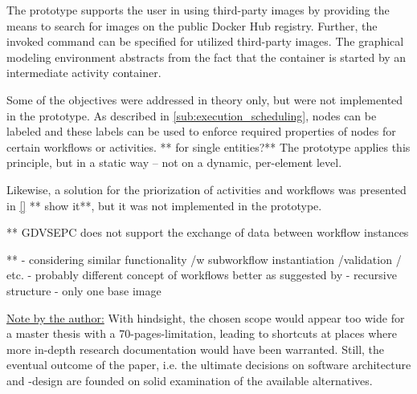   The prototype supports the user in using third-party images by providing the means to search for images on the public Docker Hub registry. Further, the invoked command can be specified for utilized third-party images. The graphical modeling environment abstracts from the fact that the container is started by an intermediate activity container.


  Some of the objectives were addressed in theory only, but were not implemented in the prototype.
  As described in \ref{sub:execution_scheduling}, nodes can be labeled and these labels can be used to enforce required properties of nodes for certain workflows or activities. ** for single entities?**
  The prototype applies this principle, but in a static way -- not on a dynamic, per-element level.

  Likewise, a solution for the priorization of activities and workflows was presented in \ref{} ** show it**, but it was not implemented in the prototype.


  ** GDVSEPC does not support the exchange of data between workflow instances

  **
  - considering similar functionality /w subworkflow instantiation /validation / etc.    - probably different concept of workflows better as suggested by \cite[119]{Schulze1998Services}
   - recursive structure
   - only one base image

\underline{Note by the author:} With hindsight, the chosen scope would appear too wide for a master thesis with a 70-pages-limitation, leading to shortcuts at places where more in-depth research documentation would have been warranted. Still, the eventual outcome of the paper, i.e. the ultimate decisions on software architecture and -design are founded on solid examination of the available alternatives.
